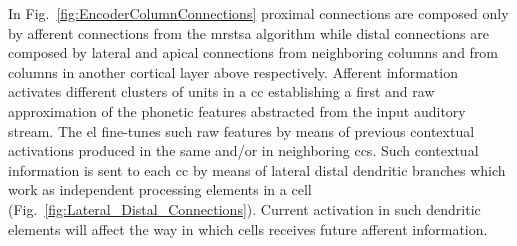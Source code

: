 \documentclass[10pt,journal,compsoc]{IEEEtran}
\begin{document}
In Fig.~\ref{fig:EncoderColumnConnections} proximal connections are composed only by afferent connections from the \gls{mrstsa} algorithm while distal connections are composed by lateral and apical connections from neighboring columns and from columns in another cortical layer above respectively. Afferent information activates different clusters of units in a \gls{cc} establishing a first and raw approximation of the phonetic features abstracted from the input auditory stream. The \gls{el} fine-tunes such raw features by means of previous contextual activations produced in the same and/or in neighboring \glspl{cc}. Such contextual information is sent to each \gls{cc} by means of lateral distal dendritic branches which work as independent processing elements in a cell (Fig.~\ref{fig:Lateral_Distal_Connections}). Current activation in such dendritic elements will affect the way in which cells receives future afferent information.
\end{document}

